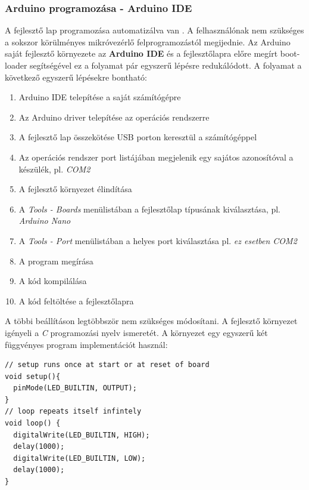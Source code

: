 \documentclass[a4paper,12pt]{article}
\begin{document}
\subsubsection{Arduino programozása - Arduino IDE}
A fejlesztő lap programozása automatizálva van \cite{ardtut19}. 
A felhasználónak nem szükséges a sokszor körülményes mikróvezérlő felprogramozástól megijednie.
Az Arduino saját fejlesztő környezete az \textbf{Arduino IDE} és a fejlesztőlapra előre megírt boot-loader segítségével ez a folyamat pár egyszerű lépésre redukálódott.
A folyamat a következő egyszerű lépésekre bontható:
\begin{enumerate}
	\item Arduino IDE telepítése a saját számítógépre
	\item Az Arduino driver telepítése az operációs rendszerre
	\item A fejlesztő lap összekötése USB porton keresztül a számítógéppel
	\item Az operációs rendszer port listájában megjelenik egy sajátos azonosítóval a készülék, pl. \textit{COM2}	
	\item A fejlesztő környezet élindítása
	\item A \textit{Tools - Boards} menülistában a fejlesztőlap típusának kiválasztása, pl. \textit{Arduino Nano}
	\item A \textit{Tools - Port} menülistában a helyes port kiválasztása pl. \textit{ez esetben COM2}
	\item A program megírása
	\item A kód kompilálása
	\item A kód feltöltése a fejlesztőlapra
\end{enumerate}

A többi beállításon legtöbbször nem szükséges módosítani.
A fejlesztő környezet igényeli a \textit{C} programozási nyelv ismeretét.
A környezet egy egyszerű két függvényes program implementációt használ:



\begin{lstlisting}[style=CStyle, caption={A \texttt{setup()} és a \texttt{loop()} függvény Arduino IDE-ben },label=fig:arduino_ide_code_eg]
// setup runs once at start or at reset of board
void setup(){
  pinMode(LED_BUILTIN, OUTPUT);
}
// loop repeats itself infintely
void loop() {
  digitalWrite(LED_BUILTIN, HIGH);
  delay(1000);
  digitalWrite(LED_BUILTIN, LOW);
  delay(1000);
}
\end{lstlisting}
\end{document}
